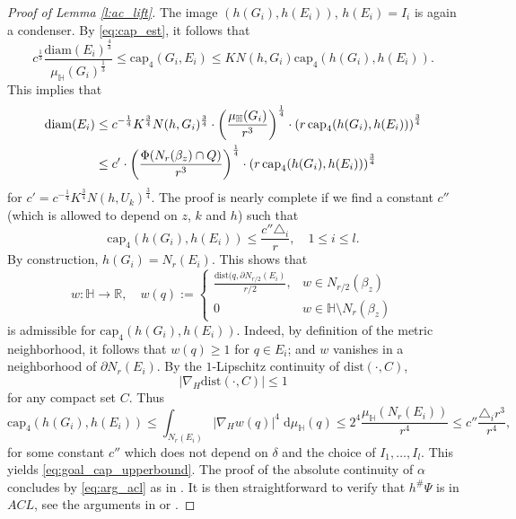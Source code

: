 \documentclass[10pt,letterpaper]{amsart}
\theoremstyle{definition}
\numberwithin{thm}{subsection}
\numberwithin{equation}{section}
\begin{document}
\begin{proof}[Proof of Lemma \ref{l:ac_lift}]
The image $(h(G_i),h(E_i))$, $h(E_i)=I_i$ is again a condenser. By \eqref{eq:cap_est}, it follows that
\begin{displaymath}
c^{\frac{1}{3}}\frac{\mathrm{diam}(E_i)^{\frac{4}{3}}}{\mu_{\mathbb{H}}(G_i)^{\frac{1}{3}}}\leq \mathrm{cap}_4(G_i,E_i)\leq K N(h,G_i) \mathrm{cap}_4(h(G_i),h(E_i)).
\end{displaymath}
This implies that
\begin{align}\label{eq:arg_acl}
\notag \mathrm{diam}(E_i) &\leq c^{-\frac{1}{4}} K^{\frac{3}{4}} N(h,G_i)^{\frac{3}{4}} \cdot \left(\frac{\mu_{\mathbb{H}}(G_i)}{r^3}\right)^{\frac{1}{4}} \cdot \left(r \, \mathrm{cap}_4(h(G_i),h(E_i))\right)^{\frac{3}{4}}\\
&\leq c' \cdot \left(\frac{\Phi(N_r(\beta_z)\cap Q)}{r^3}\right)^{\frac{1}{4}} \cdot \left(r \, \mathrm{cap}_4(h(G_i),h(E_i))\right)^{\frac{3}{4}}
\end{align}
for $c'= c^{-\frac{1}{4}} K^{\frac{3}{4}} N(h,U_k)^{\frac{3}{4}}$. The proof is nearly complete if we find a constant $c''$ (which is allowed to depend on $z$, $k$ and $h$) such that
\begin{equation}\label{eq:goal_cap_upperbound}
\mathrm{cap}_4(h(G_i),h(E_i)) \leq \frac{c'' \triangle_i}{r},\quad 1\leq i\leq l.
\end{equation}
By construction, $h(G_i)=N_r(E_i)$.
 This shows that
\begin{displaymath}
w:\mathbb{H} \to \mathbb{R},\quad w(q):= \left\{\begin{array}{ll}\frac{\mathrm{dist}(q,\partial N_{r/2}(E_i)}{r/2},&w\in N_{r/2}(\beta_z)\\ 0&w\in \mathbb{H}\setminus N_r(\beta_z) \end{array} \right.
\end{displaymath}
is admissible for  $\mathrm{cap}_4(h(G_i),h(E_i))$. Indeed, by definition of the metric neighborhood,  it follows that $w(q)\geq 1$ for $q\in E_i$; and $w$ vanishes in  a neighborhood of $\partial N_r(E_i)$.
By the $1$-Lipschitz continuity of $ \mathrm{dist}(\cdot, C)$,
$$
|\nabla_H \mathrm{dist}(\cdot, C)|\leq 1
$$
for any compact set $C$. Thus
\begin{displaymath}
\mathrm{cap}_4(h(G_i),h(E_i))\leq \int_{N_r(E_i)} |\nabla_H w(q)|^4 \;\mathrm{d}\mu_{\mathbb{H}}(q) \leq 2^4 \frac{\mu_{\mathbb{H}}(N_r(E_i))}{r^4}\leq c'' \frac{\triangle_i r^3}{r^4},
\end{displaymath}
for some constant $c''$ which does not depend on $\delta$ and the choice of $I_1,\ldots,I_l$. This yields \eqref{eq:goal_cap_upperbound}. The proof of the absolute continuity of $\alpha$ concludes by \eqref{eq:arg_acl} as in  \cite{MR2679532}. It is then straightforward to verify that $h^\#\Psi$ is in $ACL$, see the arguments in \cite{MR1207810} or \cite{MR2679532}.
\end{proof}
\end{document}
